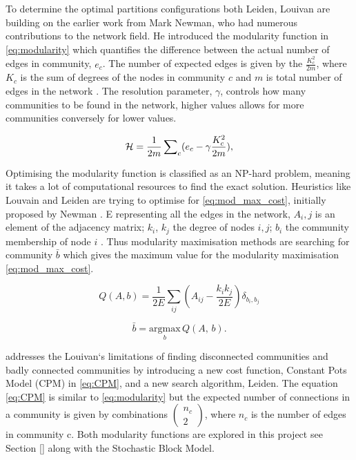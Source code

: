 To determine the optimal partitions configurations both Leiden, Louivan are building on the earlier work from Mark Newman, who had numerous contributions to the network field. He introduced the modularity function in \cref{eq:modularity} \cite{Newman2004-dd} which quantifies the difference between the actual number of edges in community, $e_c$. The number of expected edges is given by the $\frac{K_c^2}{2m}$, where $K_c$ is the sum of degrees of the nodes in community $c$ and $m$ is total number of edges in the network \cite{Traag2019-ne}. The resolution parameter, $\gamma$, controls how many communities to be found in the network, higher values allows for more communities conversely for lower values.


\begin{equation} \label{eq:modularity}
    {\mathcal H} =\frac{1}{2m}\,{\sum }_{c}({e}_{c}-{\rm{\gamma }}\frac{{K}_{c}^{2}}{2m}),
\end{equation}

Optimising the modularity function is classified as an NP-hard problem, meaning it takes a lot of computational resources to find the exact solution. Heuristics like Louvain and Leiden are trying to optimise for \cref{eq:mod_max_cost}, initially proposed by Newman \cite{Newman2006-fa}. E representing all the edges in the network, $A_i,j$ is an element of the adjacency matrix; $k_i$, $k_j$ the degree of nodes $i,j$; $b_i$ the community membership of node $i$ \cite{Peixoto2021-jx}. Thus modularity maximisation methods are searching for community $\bar{b}$ which gives the maximum value for the modularity maximisation \cref{eq:mod_max_cost}.

\begin{equation} \label{eq:mod_max_cost}
    Q(A,b) = \frac{1}{2E} \sum_{ij} \left( A_{ij} - \frac{k_i k_j}{2E} \right) \delta_{b_i, b_j}
\end{equation}

\begin{equation} \label{eq:mod_max_per_com}
    \bar{b} = \underset{b}{\mathrm{argmax}} \, Q(A, \, b).
\end{equation}

\citet{Traag2019-ne} addresses the Louivan`s limitations of finding disconnected communities  and badly connected communities by introducing a new cost function, Constant Pots Model (CPM) in \cref{eq:CPM}, and a new search algorithm, Leiden. The equation \cref{eq:CPM} is similar to \cref{eq:modularity} but the expected number of connections in a community is given by combinations $(\begin{array}{c}{n}_{c}\\ 2\end{array})$, where $n_c$ is the number of edges in community c. Both modularity functions are explored in this project see Section \ref{} along with the Stochastic Block Model.

